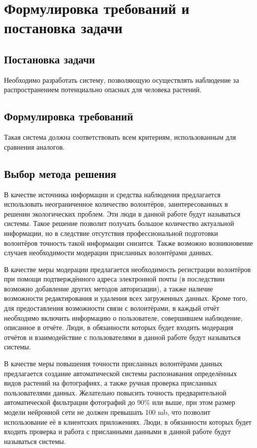 
\section{Формулировка требований и постановка задачи}

\subsection{Постановка задачи}

\tab
Необходимо разработать систему, позволяющую осуществлять наблюдение за распространением потенциально опасных для человека растений.

\subsection{Формулировка требований}

\tab
Такая система должна соответствовать всем критериям, использованным для сравнения аналогов.

\subsection{Выбор метода решения}

\tab
В качестве источника информации и средства наблюдения предлагается использовать неограниченное количество волонтёров, заинтересованных в решении экологических проблем.
Эти люди в данной работе будут называться  системы.
Такое решение позволит получать большое количество актуальной информации, но в следствие отсутствия профессиональной подготовки волонтёров точность такой информации снизится.
Также возможно возникновение случаев необходимости модерации присланных волонтёрами данных.

\nwln
В качестве меры модерации предлагается необходимость регистрации волонтёров при помощи подтверждённого адреса электронной почты (в последствии возможно добавление других методов авторизации), а также наличие возможности редактирования и удаления всех загруженных данных.
Кроме того, для предоставления возможности связи с волонтёрами, в каждый отчёт необходимо включить информацию о пользователе, совершившем наблюдение, описанное в отчёте.
Люди, в обязанности которых будет входить модерация отчётов и взаимодействие с пользователями в данной работе будут называться  системы.

\nwln
В качестве меры повышения точности присланных волонтёрами данных предлагается создание автоматической системы распознавания определённых видов растений на фотографиях, а также ручная проверка присланных пользователями данных.
Желательно повысить точность предварительной автоматической фильтрации фотографий до 90\% или выше, при этом размер модели нейронной сети не должен превышать 100 mb, что позволит использование её в клиентских приложениях.
Люди, в обязанности которых будет входить проверка и работа с присланными данными в данной работе будут называться  системы.

